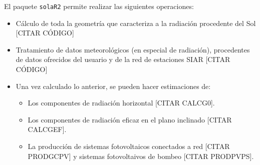 El paquete \texttt{solaR2} permite realizar las siguientes operaciones:
\begin{itemize}
\item Cálculo de toda la geometría que caracteriza a la radiación procedente del Sol [CITAR CÓDIGO]
\item Tratamiento de datos meteorológicos (en especial de radiación), procedentes de datos ofrecidos del usuario y de la red de estaciones SIAR \cite{siar23} [CITAR CÓDIGO]
\item Una vez calculado lo anterior, se pueden hacer estimaciones de:
\begin{itemize}
\item Los componentes de radiación horizontal [CITAR CALCG0].
\item Los componentes de radiación eficaz en el plano inclinado [CITAR CALCGEF].
\item La producción de sistemas fotovoltaicos conectados a red [CITAR PRODGCPV] y sistemas fotovoltaivos de bombeo [CITAR PRODPVPS].
\end{itemize}
\end{itemize}

